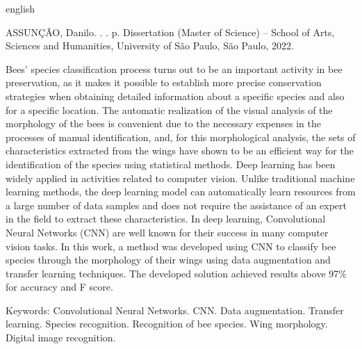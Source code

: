 \documentclass[
	12pt,				%
	oneside,			%
	a4paper,			%
	english,			%
	brazil				%
	]{abntex2ppgsi}
\begin{document}
% 
% 
\begin{resumo}[Abstract]
\begin{otherlanguage*}{english}

% 
%
%
%
\begin{flushleft}
ASSUNÇÃO, Danilo. \textbf{\imprimirtitulo}. \imprimirdata. \pageref{LastPage} p. Dissertation (Master of Science) – School of Arts, Sciences and Humanities, University of São Paulo, São Paulo, 2022.
\end{flushleft}

Bees' species classification process turns out to be an important activity in bee preservation, as it makes it possible to establish more precise conservation strategies when obtaining detailed information about a specific species and also for a specific location. The automatic realization of the visual analysis of the morphology of the bees is convenient due to the necessary expenses in the processes of manual identification, and, for this morphological analysis, the sets of characteristics extracted from the wings have shown to be an efficient way for the identification of the species using statistical methods. Deep learning has been widely applied in activities related to computer vision. Unlike traditional machine learning methods, the deep learning model can automatically learn resources from a large number of data samples and does not require the assistance of an expert in the field to extract these characteristics. In deep learning, Convolutional Neural Networks (CNN) are well known for their success in many computer vision tasks. In this work, a method was developed using CNN to classify bee species through the morphology of their wings using data augmentation and transfer learning techniques. The developed solution achieved results above 97\% for accuracy and F score.

Keywords: Convolutional Neural Networks. CNN. Data augmentation. Transfer learning. Species recognition. Recognition of bee species. Wing morphology. Digital image recognition.
\end{otherlanguage*}
\end{resumo}
\end{document}
